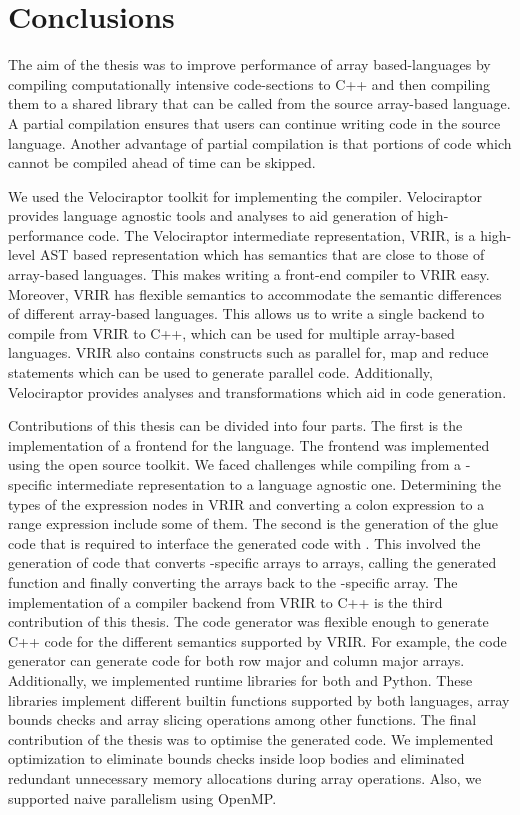 \section{Conclusions}
The aim of the thesis was to improve performance of array based-languages by compiling computationally intensive code-sections to C++ and then compiling them to a shared library that can be called from the source array-based language. A partial compilation ensures that users can continue writing code in the source language. Another advantage of partial compilation is that portions of code which cannot be compiled ahead of time can be skipped. 

We used the Velociraptor toolkit for implementing the compiler. Velociraptor provides language agnostic tools and analyses to aid generation of high-performance code. The Velociraptor intermediate representation, VRIR, is a high-level AST based representation which has semantics that are close to those of array-based languages. This makes writing a front-end compiler to VRIR easy. Moreover, VRIR has flexible semantics to accommodate the semantic differences of different array-based languages. This allows us to write a single backend to compile from VRIR to C++, which can be used for multiple array-based languages. VRIR also contains constructs such as parallel for, map and reduce statements which can be used to generate parallel code. Additionally, Velociraptor provides analyses and transformations which aid in code generation. 

Contributions of this thesis can be divided into four parts. The first is the implementation of a frontend for the \matlab language. The frontend was implemented using the open source \mclab toolkit. We faced challenges while compiling from a \matlab-specific intermediate representation to a language agnostic one. Determining the types of the expression nodes in VRIR and converting a colon expression to a range expression include some of them. The second is the generation of the glue code that is required to interface the generated code with \matlab. This involved the generation of code that converts \matlab-specific arrays to \velocty arrays, calling the generated function and finally converting the \velocty arrays back to the \matlab-specific array. The implementation of a compiler backend from VRIR to C++ is the third contribution of this thesis. The code generator was flexible enough to generate C++ code for the different semantics supported by VRIR. For example, the code generator can generate code for both row major and column major arrays. Additionally, we implemented runtime libraries for both \matlab and Python. These libraries implement different builtin functions supported by both languages, array bounds checks and array slicing operations among other functions. The final contribution of the thesis was to optimise the generated code. We implemented optimization to eliminate bounds checks inside loop bodies and eliminated redundant unnecessary memory allocations during array operations. Also, we supported naive parallelism using OpenMP.  

